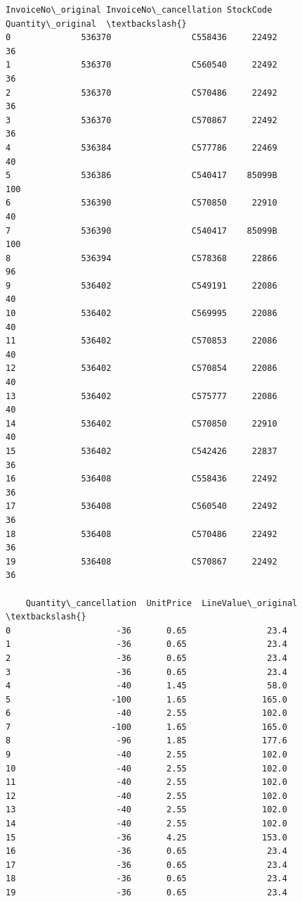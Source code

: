 \documentclass[11pt]{article}
\begin{document}
    
    \begin{Verbatim}[commandchars=\\\{\}]
   InvoiceNo\_original InvoiceNo\_cancellation StockCode  Quantity\_original  \textbackslash{}
0              536370                C558436     22492                 36   
1              536370                C560540     22492                 36   
2              536370                C570486     22492                 36   
3              536370                C570867     22492                 36   
4              536384                C577786     22469                 40   
5              536386                C540417    85099B                100   
6              536390                C570850     22910                 40   
7              536390                C540417    85099B                100   
8              536394                C578368     22866                 96   
9              536402                C549191     22086                 40   
10             536402                C569995     22086                 40   
11             536402                C570853     22086                 40   
12             536402                C570854     22086                 40   
13             536402                C575777     22086                 40   
14             536402                C570850     22910                 40   
15             536402                C542426     22837                 36   
16             536408                C558436     22492                 36   
17             536408                C560540     22492                 36   
18             536408                C570486     22492                 36   
19             536408                C570867     22492                 36   

    Quantity\_cancellation  UnitPrice  LineValue\_original  \textbackslash{}
0                     -36       0.65                23.4   
1                     -36       0.65                23.4   
2                     -36       0.65                23.4   
3                     -36       0.65                23.4   
4                     -40       1.45                58.0   
5                    -100       1.65               165.0   
6                     -40       2.55               102.0   
7                    -100       1.65               165.0   
8                     -96       1.85               177.6   
9                     -40       2.55               102.0   
10                    -40       2.55               102.0   
11                    -40       2.55               102.0   
12                    -40       2.55               102.0   
13                    -40       2.55               102.0   
14                    -40       2.55               102.0   
15                    -36       4.25               153.0   
16                    -36       0.65                23.4   
17                    -36       0.65                23.4   
18                    -36       0.65                23.4   
19                    -36       0.65                23.4   


\end{Verbatim}
\end{document}
